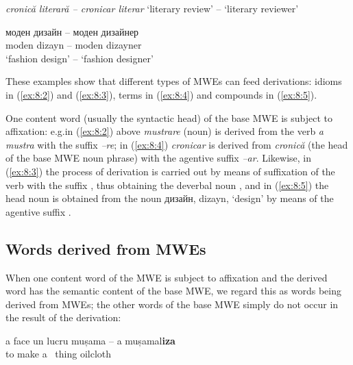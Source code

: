 \documentclass[output=paper]{langsci/langscibook}
\begin{document}
\begin{exe}
\ex \label{ex:8:4}
\settowidth{}
\textit{cronică literară -- cronicar literar} 
‘literary review’ -- ‘literary reviewer’
\end{exe}
 
\begin{exe}
\ex \label{ex:8:5}
\settowidth{}
\gll моден дизайн -- моден дизайнер\\
moden dizayn -- moden dizayner\\ 
\glt `fashion design' -- `fashion designer'
\end{exe}
 

These examples show that different types of MWEs can feed derivations:
idioms in (\ref{ex:8:2}) and (\ref{ex:8:3}), terms in (\ref{ex:8:4}) and compounds in (\ref{ex:8:5}).



One content word (usually the syntactic head) of the base MWE is subject
to affixation: e.g.\@ in (\ref{ex:8:2}) above \textit{mustrare} (noun) is derived from the
verb \textit{a mustra} with the suffix \textit{–re}; in (\ref{ex:8:4}) \textit{cronicar} is derived
from \textit{cronică} (the head of the base MWE noun phrase) with the agentive
suffix \textit{–ar}. Likewise, in (\ref{ex:8:3}) the process of derivation is carried out
by means of suffixation of the verb 
 with the suffix ,
thus obtaining the deverbal noun 
, and in (\ref{ex:8:5}) the head noun
 is obtained from the noun дизайн, dizayn,  `design' by means of the agentive
suffix  .


\subsection{Words derived from MWEs}
\label{wordsfrommwes}

When one content word of the MWE is subject to affixation and the
derived word has the semantic content of the base MWE, we regard this as words being  derived from MWEs; the other words of the base MWE simply do not
occur in the result of the derivation:


\begin{exe}
\ex \label{ex:8:6}
\settowidth{}
\gll a face un lucru mușama -- a mușamal\textbf{iza}  \\
 to make a~ thing oilcloth \\ 
\end{exe}
\end{document}
